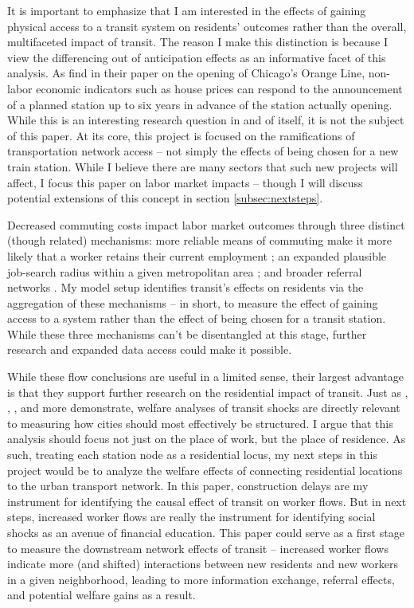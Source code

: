 \documentclass[12pt]{article}
\begin{document}
It is important to emphasize that I am interested in the effects of gaining physical access to a transit system on residents' outcomes rather than the overall, multifaceted impact of transit. The reason I make this distinction is because I view the differencing out of anticipation effects as an informative facet of this analysis. As \textcite{mcmillenReactionHousePrices2004} find in their paper on the opening of Chicago's Orange Line, non-labor economic indicators such as house prices can respond to the announcement of a planned station up to six years in advance of the station actually opening. While this is an interesting research question in and of itself, it is not the subject of this paper. At its core, this project is focused on the ramifications of transportation network access -- not simply the effects of being chosen for a new train station. While I believe there are many sectors that such new projects will affect, I focus this paper on labor market impacts -- though I will discuss potential extensions of this concept in section \ref{subsec:nextsteps}.

Decreased commuting costs impact labor market outcomes through three distinct (though related) mechanisms: more reliable means of commuting make it more likely that a worker retains their current employment \parencite{sanchezConnectionPublicTransit1999}; an expanded plausible job-search radius within a given metropolitan area  \parencite{perezUrbanTransitInfrastructure2022, donaldsonRailroadsAmericanEconomic2016}; and broader referral networks \parencite{patacchini_referral_fx, kimSpatialInteractions2023}. My model setup identifies transit's effects on residents via the aggregation of these mechanisms  --  in short, to measure the effect of gaining access to a system rather than the effect of being chosen for a transit station. While these three mechanisms can't be disentangled at this stage, further research and expanded data access could make it possible. 

While these flow conclusions are useful in a limited sense, their largest advantage is that they support further research on the residential impact of transit. Just as \cite{perezUrbanTransitInfrastructure2022}, \cite{almagro_amenities}, \cite{tsivanidisEvaluatingImpactUrban2026}, and more demonstrate, welfare analyses of transit shocks are directly relevant to measuring how cities should most effectively be structured. I argue that this analysis should focus not just on the place of work, but the place of residence. As such, treating each station node as a residential locus, my next steps in this project would be to analyze the welfare effects of connecting residential locations to the urban transport network. In this paper, construction delays are my instrument for identifying the causal effect of transit on worker flows. But in next steps, increased worker flows are really the instrument for identifying social shocks as an avenue of financial education.  This paper could serve as a first stage to measure the downstream network effects of transit  --  increased worker flows indicate more (and shifted) interactions between new residents and new workers in a given neighborhood, leading to more information exchange, referral effects, and potential welfare gains as a result. 
\end{document}
